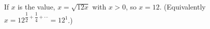 If $x$ is the value, $x=\sqrt{12x}$ with $x>0$, so $x=\boxed{12}$. (Equivalently $x=12^{\dfrac12+\dfrac14+\cdots}=12^1$.)

